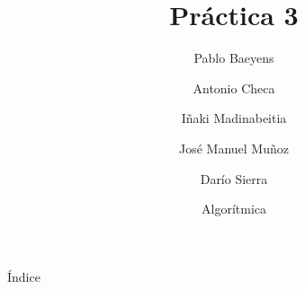 \documentclass[10pt,compress,usetitleprogressbar,mathserif]{beamer}
\title{Práctica 3}
\author{Pablo Baeyens \and Antonio Checa \and Iñaki Madinabeitia \and José Manuel Muñoz \and Darío Sierra}
\date{Algorítmica}
\begin{document}
\maketitle

\begin{frame}{Índice}
  \tableofcontents
\end{frame}


\end{document}
